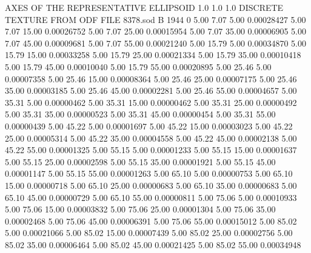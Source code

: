  AXES OF THE REPRESENTATIVE ELLIPSOID
    1.0   1.0   1.0
DISCRETE TEXTURE FROM ODF FILE  8378.sod                                
B    1944   0
      5.00      7.07      5.00     0.00028427
      5.00      7.07     15.00     0.00026752
      5.00      7.07     25.00     0.00015954
      5.00      7.07     35.00     0.00006905
      5.00      7.07     45.00     0.00009681
      5.00      7.07     55.00     0.00021240
      5.00     15.79      5.00     0.00034870
      5.00     15.79     15.00     0.00033258
      5.00     15.79     25.00     0.00021334
      5.00     15.79     35.00     0.00010418
      5.00     15.79     45.00     0.00010040
      5.00     15.79     55.00     0.00020895
      5.00     25.46      5.00     0.00007358
      5.00     25.46     15.00     0.00008364
      5.00     25.46     25.00     0.00007175
      5.00     25.46     35.00     0.00003185
      5.00     25.46     45.00     0.00002281
      5.00     25.46     55.00     0.00004657
      5.00     35.31      5.00     0.00000462
      5.00     35.31     15.00     0.00000462
      5.00     35.31     25.00     0.00000492
      5.00     35.31     35.00     0.00000523
      5.00     35.31     45.00     0.00000454
      5.00     35.31     55.00     0.00000439
      5.00     45.22      5.00     0.00001697
      5.00     45.22     15.00     0.00003023
      5.00     45.22     25.00     0.00005314
      5.00     45.22     35.00     0.00004558
      5.00     45.22     45.00     0.00002138
      5.00     45.22     55.00     0.00001325
      5.00     55.15      5.00     0.00001233
      5.00     55.15     15.00     0.00001637
      5.00     55.15     25.00     0.00002598
      5.00     55.15     35.00     0.00001921
      5.00     55.15     45.00     0.00001147
      5.00     55.15     55.00     0.00001263
      5.00     65.10      5.00     0.00000753
      5.00     65.10     15.00     0.00000718
      5.00     65.10     25.00     0.00000683
      5.00     65.10     35.00     0.00000683
      5.00     65.10     45.00     0.00000729
      5.00     65.10     55.00     0.00000811
      5.00     75.06      5.00     0.00010933
      5.00     75.06     15.00     0.00003832
      5.00     75.06     25.00     0.00001304
      5.00     75.06     35.00     0.00002468
      5.00     75.06     45.00     0.00006391
      5.00     75.06     55.00     0.00015012
      5.00     85.02      5.00     0.00021066
      5.00     85.02     15.00     0.00007439
      5.00     85.02     25.00     0.00002756
      5.00     85.02     35.00     0.00006464
      5.00     85.02     45.00     0.00021425
      5.00     85.02     55.00     0.00034948
